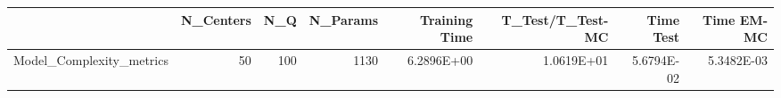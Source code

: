 \begin{tabular}{lrrrrrrr}
\toprule
{} &  N\_Centers &  N\_Q &  N\_Params &  Training Time &  T\_Test/T\_Test-MC &  Time Test &  Time EM-MC \\
\midrule
Model\_Complexity\_metrics &         50 &  100 &      1130 &     6.2896E+00 &        1.0619E+01 & 5.6794E-02 &  5.3482E-03 \\
\bottomrule
\end{tabular}
